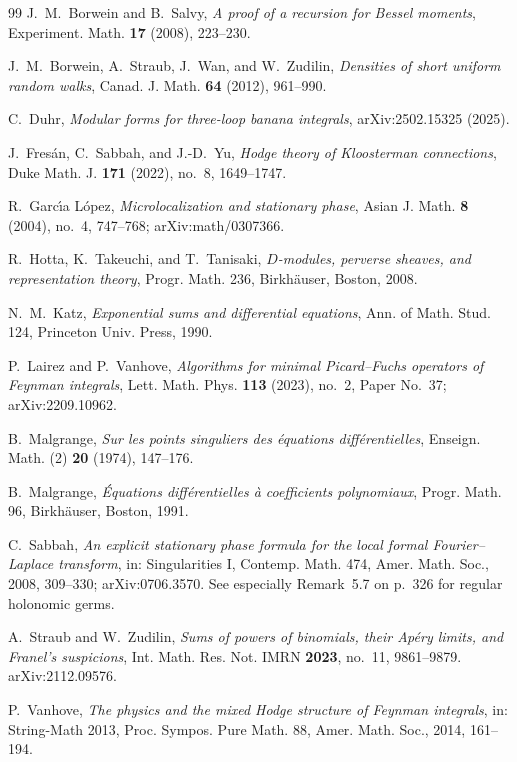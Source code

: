 \documentclass[11pt,a4paper]{article}
\theoremstyle{definition}
\theoremstyle{remark}
\numberwithin{equation}{section}
\begin{document}
\begin{thebibliography}{99}
J.~M.~Borwein and B.~Salvy,
\emph{A proof of a recursion for Bessel moments},
Experiment. Math. \textbf{17} (2008), 223--230.

J.~M.~Borwein, A.~Straub, J.~Wan, and W.~Zudilin,
\emph{Densities of short uniform random walks},
Canad. J. Math. \textbf{64} (2012), 961--990.

C.~Duhr,
\emph{Modular forms for three-loop banana integrals},
arXiv:2502.15325 (2025).

J.~Fres\'an, C.~Sabbah, and J.-D.~Yu,
\emph{Hodge theory of Kloosterman connections},
Duke Math. J. \textbf{171} (2022), no.~8, 1649--1747.

R.~Garc\'{\i}a L\'opez,
\emph{Microlocalization and stationary phase},
Asian J. Math. \textbf{8} (2004), no.~4, 747--768; arXiv:math/0307366.

R.~Hotta, K.~Takeuchi, and T.~Tanisaki,
\emph{$D$-modules, perverse sheaves, and representation theory},
Progr. Math. 236, Birkh\"auser, Boston, 2008.

N.~M.~Katz,
\emph{Exponential sums and differential equations},
Ann. of Math. Stud. 124, Princeton Univ. Press, 1990.

P.~Lairez and P.~Vanhove,
\emph{Algorithms for minimal Picard--Fuchs operators of Feynman integrals},
Lett. Math. Phys. \textbf{113} (2023), no.~2, Paper No.~37; arXiv:2209.10962.

B.~Malgrange,
\emph{Sur les points singuliers des \'equations diff\'erentielles},
Enseign. Math. (2) \textbf{20} (1974), 147--176.

B.~Malgrange,
\emph{\'Equations diff\'erentielles \`a coefficients polynomiaux},
Progr. Math. 96, Birkh\"auser, Boston, 1991.

C.~Sabbah,
\emph{An explicit stationary phase formula for the local formal Fourier--Laplace transform},
in: Singularities I, Contemp. Math. 474, Amer. Math. Soc., 2008, 309--330; arXiv:0706.3570. See especially Remark~5.7 on p.~326 for regular holonomic germs.

A.~Straub and W.~Zudilin,
\emph{Sums of powers of binomials, their Ap\'ery limits, and Franel's suspicions},
Int. Math. Res. Not. IMRN \textbf{2023}, no.~11, 9861--9879. arXiv:2112.09576.

P.~Vanhove,
\emph{The physics and the mixed Hodge structure of Feynman integrals},
in: String-Math 2013, Proc. Sympos. Pure Math. 88, Amer. Math. Soc., 2014, 161--194.


\end{thebibliography}
\end{document}
